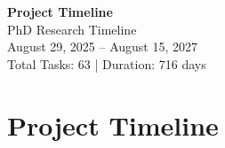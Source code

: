 \documentclass[portrait,a4paper]{article}
\begin{document}
\begin{center}
\vspace*{2cm}
{\Huge\bfseries Project Timeline}\\
\vspace{1cm}
{\Large PhD Research Timeline}\\
\vspace{0.5cm}
{\large August 29, 2025 -- August 15, 2027}\\
\vspace{1cm}
{\large Total Tasks: 63 | Duration: 716 days}
\end{center}

\vspace{2cm}

\section*{Project Timeline}
\end{document}
